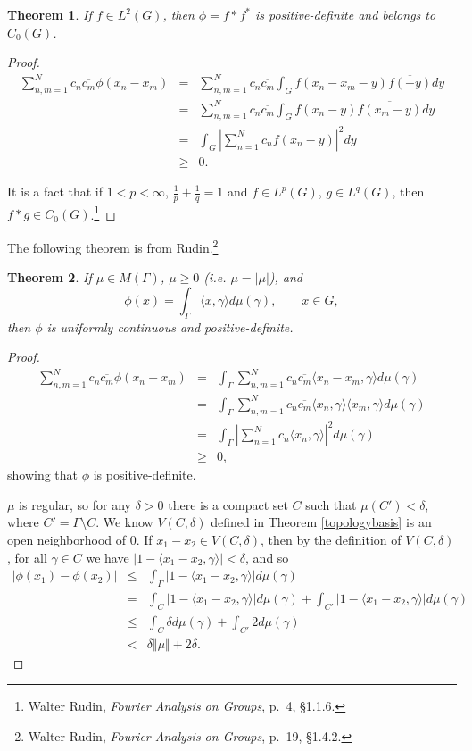\documentclass{article}
\newcommand{\inner}[2]{\langle #1, #2 \rangle}
\newcommand{\norm}[1]{\Vert #1 \Vert}
\newtheorem{theorem}{Theorem}
\begin{document}
\begin{theorem}
If $f \in L^2(G)$, then $\phi = f* f^*$ is positive-definite and belongs to $C_0(G)$.
\label{selfconv}
\end{theorem}
\begin{proof}
\begin{eqnarray*}
\sum_{n,m=1}^N c_n \overline{c_m} \phi(x_n-x_m)&=&\sum_{n,m=1}^Nc_n\overline{c_m} \int_G f(x_n-x_m - y) \overline{f(-y)} dy\\
&=&\sum_{n,m=1}^Nc_n\overline{c_m} \int_G f(x_n - y) \overline{f(x_m-y)} dy\\
&=&\int_G \left| \sum_{n=1}^N c_n f(x_n-y)\right|^2 dy\\
&\geq&0.
\end{eqnarray*}

It is a fact that if $1<p<\infty$, $\frac{1}{p}+\frac{1}{q}=1$ and $f \in L^p(G)$, $g \in L^q(G)$, then $f*g \in C_0(G)$.\footnote{Walter
Rudin, {\em Fourier Analysis on Groups}, p.~4, \S 1.1.6.}
\end{proof}


The following theorem is from Rudin.\footnote{Walter Rudin, {\em Fourier Analysis on Groups}, p.~19, \S 1.4.2.}

\begin{theorem}
If $\mu \in M(\Gamma)$, $\mu \geq 0$ (i.e. $\mu=|\mu|$), and 
\[
\phi(x)=\int_\Gamma \inner{x}{\gamma} d\mu(\gamma), \qquad x \in G,
\]
then $\phi$ is uniformly continuous and positive-definite.
\end{theorem}
\begin{proof}
\begin{eqnarray*}
\sum_{n,m=1}^N c_n \overline{c_m} \phi(x_n-x_m)&=&\int_\Gamma \sum_{n,m=1}^N c_n \overline{c_m} \inner{x_n-x_m}{\gamma} d\mu(\gamma)\\
&=&\int_\Gamma \sum_{n,m=1}^N c_n \overline{c_m} \inner{x_n}{\gamma} \overline{\inner{x_m}{\gamma}} d\mu(\gamma)\\
&=&\int_\Gamma \left| \sum_{n=1}^N c_n \inner{x_n}{\gamma} \right|^2 d\mu(\gamma)\\
&\geq&0,
\end{eqnarray*}
showing that $\phi$ is positive-definite.

$\mu$ is regular, so for any $\delta>0$ there is a compact set $C$ such that $\mu(C')<\delta$, where $C'=\Gamma \setminus C$. 
We know $V(C,\delta)$ defined in Theorem \ref{topologybasis} is an open neighborhood of $0$. If $x_1-x_2 \in V(C,\delta)$, then 
by the definition of $V(C,\delta)$, for all $\gamma \in C$ we have $|1-\inner{x_1-x_2}{\gamma}|<\delta$, and so
\begin{eqnarray*}
|\phi(x_1)-\phi(x_2)|&\leq&\int_\Gamma |1-\inner{x_1-x_2}{\gamma}| d\mu(\gamma)\\
&=&\int_C |1-\inner{x_1-x_2}{\gamma}| d\mu(\gamma) + \int_{C'} |1-\inner{x_1-x_2}{\gamma}| d\mu(\gamma)\\
&\leq&\int_C \delta d\mu(\gamma) + \int_{C'} 2 d\mu(\gamma)\\
&<& \delta \norm{\mu} + 2\delta.
\end{eqnarray*}
\end{proof}
\end{document}
